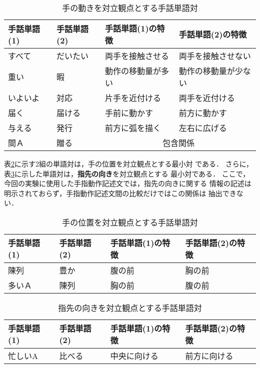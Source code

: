 \begin{table}[htbp]
\caption{手の動きを対立観点とする手話単語対}
\label{kekka.32}
\begin{center}
\tabcolsep=3pt\footnotesize
\begin{tabular}{l|l||l|l}\hline
 手話単語(1)&手話単語(2)&手話単語(1)の特徴 & 手話単語(2)の特徴\\
\hline\hline
 すべて   & だいたい & 両手を接触させる   & 両手を接触させない\\
 重い     & 暇       & 動作の移動量が多い & 動作の移動量が少ない\\
 いよいよ & 対応     & 片手を近付ける     & 両手を近付ける\\
 届く     & 届ける   & 手前に動かす       & 前方に動かす\\
 与える   & 発行     & 前方に弧を描く     & 左右に広げる\\
 間Ａ     & 贈る     & \multicolumn{2}{c}{包含関係}\\
\hline
\end{tabular}
\end{center}
\end{table}


表\ref{kekka.33}に示す2組の単語対は，{\gt 手の位置}を対立観点とする最小対
である．
さらに，表\ref{kekka.34}に示した単語対は，{\bf 指先の向き}を対立観点とする
最小対である．
ここで，今回の実験に使用した手指動作記述文では，指先の向きに関する
情報の記述は明示されておらず，手指動作記述文間の比較だけではこの関係は
抽出できない．

\begin{table}[htbp]
\caption{手の位置を対立観点とする手話単語対}
\label{kekka.33}
\begin{center}
\tabcolsep=3pt\footnotesize
\begin{tabular}{l|l||l|l}\hline
 手話単語(1)&手話単語(2)&手話単語(1)の特徴 & 手話単語(2)の特徴\\
\hline\hline
 陳列 & 豊か & 腹の前 & 胸の前\\
 多いＡ & 陳列 & 胸の前 & 腹の前\\
\hline
\end{tabular}
\end{center}
\end{table}

\begin{table}[htbp]
\caption{指先の向きを対立観点とする手話単語対}
\label{kekka.34}
\begin{center}
\tabcolsep=3pt\footnotesize
\begin{tabular}{l|l||l|l}\hline
手話単語(1)&手話単語(2)&手話単語(1)の特徴 & 手話単語(2)の特徴\\
\hline\hline
 忙しいA & 比べる &  中央に向ける & 前方に向ける \\
\hline
\end{tabular}
\end{center}
\end{table}

